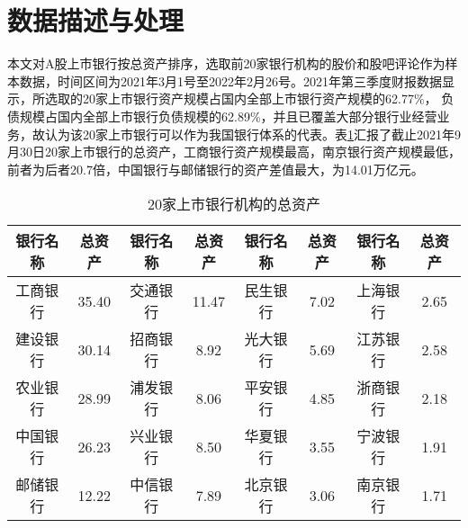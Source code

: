 \documentclass[lang=cn]{elegantpaper}
\begin{document}
\section{数据描述与处理}
本文对A股上市银行按总资产排序，选取前20家银行机构的股价和股吧评论作为样本数据，时间区间为2021年3月1号至2022年2月26号。2021年第三季度财报数据显示，所选取的20家上市银行资产规模占国内全部上市银行资产规模的62.77\%， 负债规模占国内全部上市银行负债规模的62.89\%，并且已覆盖大部分银行业经营业务，故认为该20家上市银行可以作为我国银行体系的代表。表\ref{表2}汇报了截止2021年9月30日20家上市银行的总资产，工商银行资产规模最高，南京银行资产规模最低，前者为后者20.7倍，中国银行与邮储银行的资产差值最大，为14.01万亿元。
\begin{table}[htb]
    \centering
    \caption{20家上市银行机构的总资产}
    \label{表2}
	\begin{tabular*}{\textwidth}{@{}@{\extracolsep{\fill}}cccccccc@{}}
    \toprule
    银行名称 & 总资产   & 银行名称 & 总资产   & 银行名称 & 总资产  & 银行名称 & 总资产  \\ \midrule
    工商银行 & 35.40 & 交通银行 & 11.47 & 民生银行 & 7.02 & 上海银行 & 2.65 \\
    建设银行 & 30.14 & 招商银行 & 8.92  & 光大银行 & 5.69 & 江苏银行 & 2.58 \\
    农业银行 & 28.99 & 浦发银行 & 8.06  & 平安银行 & 4.85 & 浙商银行 & 2.18 \\
    中国银行 & 26.23 & 兴业银行 & 8.50  & 华夏银行 & 3.55 & 宁波银行 & 1.91 \\
    邮储银行 & 12.22 & 中信银行 & 7.89  & 北京银行 & 3.06 & 南京银行 & 1.71 \\ \bottomrule
    \end{tabular*}
\end{table}
\end{document}
